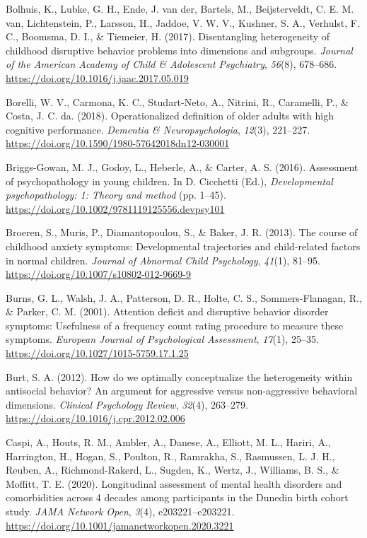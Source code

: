 \documentclass[
  american,
  letterpaper,
  12pt]{article}
\newlength{\cslhangindent}
\newenvironment{CSLReferences}[2] %
 {\begin{list}{}{%
  \setlength{\itemindent}{0pt}
  \setlength{\leftmargin}{0pt}
  \setlength{\parsep}{0pt}
  \ifodd #1
   \setlength{\leftmargin}{\cslhangindent}
   \setlength{\itemindent}{-1\cslhangindent}
  \fi
  \setlength{\itemsep}{#2\baselineskip}}}
 {\end{list}}
\begin{document}
\begin{CSLReferences}{1}{0}
Bolhuis, K., Lubke, G. H., Ende, J. van der, Bartels, M., Beijsterveldt,
C. E. M. van, Lichtenstein, P., Larsson, H., Jaddoe, V. W. V., Kushner,
S. A., Verhulst, F. C., Boomsma, D. I., \& Tiemeier, H. (2017).
Disentangling heterogeneity of childhood disruptive behavior problems
into dimensions and subgroups. \emph{Journal of the American Academy of
Child \& Adolescent Psychiatry}, \emph{56}(8), 678--686.
\url{https://doi.org/10.1016/j.jaac.2017.05.019}

Borelli, W. V., Carmona, K. C., Studart-Neto, A., Nitrini, R.,
Caramelli, P., \& Costa, J. C. da. (2018). Operationalized definition of
older adults with high cognitive performance. \emph{Dementia \&
Neuropsychologia}, \emph{12}(3), 221--227.
\url{https://doi.org/10.1590/1980-57642018dn12-030001}

Briggs-Gowan, M. J., Godoy, L., Heberle, A., \& Carter, A. S. (2016).
Assessment of psychopathology in young children. In D. Cicchetti (Ed.),
\emph{Developmental psychopathology: 1: Theory and method} (pp. 1--45).
\url{https://doi.org/10.1002/9781119125556.devpsy101}

Broeren, S., Muris, P., Diamantopoulou, S., \& Baker, J. R. (2013). The
course of childhood anxiety symptoms: {Developmental} trajectories and
child-related factors in normal children. \emph{Journal of Abnormal
Child Psychology}, \emph{41}(1), 81--95.
\url{https://doi.org/10.1007/s10802-012-9669-9}

Burns, G. L., Walsh, J. A., Patterson, D. R., Holte, C. S.,
Sommers-Flanagan, R., \& Parker, C. M. (2001). Attention deficit and
disruptive behavior disorder symptoms: {Usefulness} of a frequency count
rating procedure to measure these symptoms. \emph{European Journal of
Psychological Assessment}, \emph{17}(1), 25--35.
\url{https://doi.org/10.1027/1015-5759.17.1.25}

Burt, S. A. (2012). How do we optimally conceptualize the heterogeneity
within antisocial behavior? {An} argument for aggressive versus
non-aggressive behavioral dimensions. \emph{Clinical Psychology Review},
\emph{32}(4), 263--279. \url{https://doi.org/10.1016/j.cpr.2012.02.006}

Caspi, A., Houts, R. M., Ambler, A., Danese, A., Elliott, M. L., Hariri,
A., Harrington, H., Hogan, S., Poulton, R., Ramrakha, S., Rasmussen, L.
J. H., Reuben, A., Richmond-Rakerd, L., Sugden, K., Wertz, J., Williams,
B. S., \& Moffitt, T. E. (2020). Longitudinal assessment of mental
health disorders and comorbidities across 4 decades among participants
in the {Dunedin} birth cohort study. \emph{JAMA Network Open},
\emph{3}(4), e203221--e203221.
\url{https://doi.org/10.1001/jamanetworkopen.2020.3221}


\end{CSLReferences}
\end{document}
